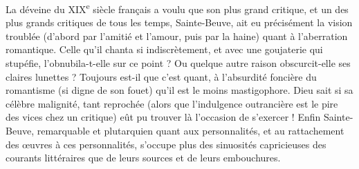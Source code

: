 \documentclass[french,twoside]{book} %
\begin{document}
La déveine du XIX\textsuperscript{e} siècle français a voulu que son plus grand critique, et un des plus grands critiques de tous les temps, Sainte-Beuve, ait eu précisément la vision troublée (d’abord par l’amitié et l’amour, puis par la haine) quant à l’aberration romantique. Celle qu’il chanta si indiscrètement, et avec une goujaterie qui stupéfie, l’obnubila-t-elle sur ce point ? Ou quelque autre raison obscurcit-elle ses claires lunettes ? Toujours est-il que c’est quant, à l’absurdité foncière du romantisme (si digne de son fouet) qu’il est le moins mastigophore. Dieu sait si sa célèbre malignité, tant reprochée (alors que l’indulgence outrancière est le pire des vices chez un critique) eût pu trouver là l’occasion de s’exercer ! Enfin Sainte-Beuve, remarquable et plutarquien quant aux personnalités, et au rattachement des œuvres à ces personnalités, s’occupe plus des sinuosités capricieuses des courants littéraires que de leurs sources et de leurs embouchures.\par
\end{document}
